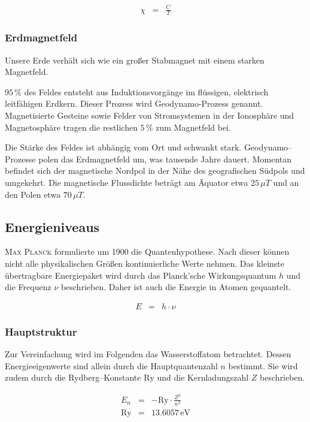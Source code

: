 \documentclass[12pt,a4paper]{scrartcl}
\numberwithin{equation}{section} %
\begin{document}
\begin{eqnarray}
	\chi &=& \frac{C}{T}
\end{eqnarray}

\subsubsection{Erdmagnetfeld}
\label{Erdmagnetfeld}
Unsere Erde verhält sich wie ein großer Stabmagnet mit einem starken Magnetfeld.

$95\,\%$ des Feldes entsteht aus Induktionsvorgänge im flüssigen, elektrisch leitfähigen Erdkern. Dieser Prozess wird Geodynamo-Prozess genannt. Magnetisierte Gesteine sowie Felder von Stromsystemen in der Ionosphäre und Magnetosphäre tragen die restlichen $5\,\%$ zum Magnetfeld bei.

Die Stärke des Feldes ist abhängig vom Ort und schwankt stark. Geodynamo--Prozesse polen das Erdmagnetfeld um, was tausende Jahre dauert. Momentan befindet sich der magnetische Nordpol in der Nähe des geografischen Südpols und umgekehrt. Die magnetische Flussdichte beträgt am Äquator etwa $25\,\mu T$ und an den Polen etwa $70\,\mu T$. \cite{Geomagnetismus}

\subsection{Energieniveaus}
\label{Energieniveaus}

\textsc{Max Planck} formulierte um 1900 die Quantenhypothese. Nach dieser können nicht alle physikalischen Größen kontinuierliche Werte nehmen. Das kleinste übertragbare Energiepaket wird durch das Planck'sche Wirkungsquantum $h$ und die Frequenz $\nu$ beschrieben. Daher ist auch die Energie in Atomen gequantelt.

\begin{eqnarray}
	E &=& h\cdot \nu \label{eq:Energie Strahlung}
\end{eqnarray}

\subsubsection{Hauptstruktur}
\label{Wasserstoffatom}
Zur Vereinfachung wird im Folgenden das Wasserstoffatom betrachtet. Dessen Energieeigenwerte sind allein durch die Hauptquantenzahl $n$ bestimmt. Sie wird zudem durch die Rydberg--Konstante $\mathrm{Ry}$ und die Kernladungszahl $Z$ beschrieben.

\begin{eqnarray}
	E_n &=& - \mathrm{Ry} \cdot \frac{Z^2}{n^2} \\
	\mathrm{Ry} &=& 13.6057 \mathrm{\,eV}
\end{eqnarray}
\end{document}
